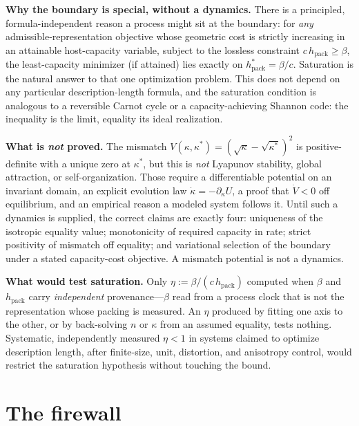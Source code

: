 \documentclass[11pt,reqno]{amsart}
\theoremstyle{plain}
\theoremstyle{definition}
\newcommand{\hpack}{h_{\mathrm{pack}}}
\begin{document}
\noindent\textbf{Why the boundary is special, without a dynamics.} There is a principled, formula-independent reason a process might sit at the boundary: for \emph{any} admissible-representation objective whose geometric cost is strictly increasing in an attainable host-capacity variable, subject to the lossless constraint $c\,\hpack\ge\beta$, the least-capacity minimizer (if attained) lies exactly on $\hpack^*=\beta/c$. Saturation is the natural answer to that one optimization problem. This does not depend on any particular description-length formula, and the saturation condition is analogous to a reversible Carnot cycle or a capacity-achieving Shannon code: the inequality is the limit, equality its ideal realization.

\medskip
\noindent\textbf{What is \emph{not} proved.} The mismatch $V(\kappa,\kappa^*)=(\sqrt\kappa-\sqrt{\kappa^*})^2$ is positive-definite with a unique zero at $\kappa^*$, but this is \emph{not} Lyapunov stability, global attraction, or self-organization. Those require a differentiable potential on an invariant domain, an explicit evolution law $\dot\kappa=-\partial_\kappa U$, a proof that $\dot V<0$ off equilibrium, and an empirical reason a modeled system follows it. Until such a dynamics is supplied, the correct claims are exactly four: uniqueness of the isotropic equality value; monotonicity of required capacity in rate; strict positivity of mismatch off equality; and variational selection of the boundary under a stated capacity-cost objective. A mismatch potential is not a dynamics.

\medskip
\noindent\textbf{What would test saturation.} Only $\eta:=\beta/(c\,\hpack)$ computed when $\beta$ and $\hpack$ carry \emph{independent} provenance---$\beta$ read from a process clock that is not the representation whose packing is measured. An $\eta$ produced by fitting one axis to the other, or by back-solving $n$ or $\kappa$ from an assumed equality, tests nothing. Systematic, independently measured $\eta<1$ in systems claimed to optimize description length, after finite-size, unit, distortion, and anisotropy control, would restrict the saturation hypothesis without touching the bound.

\section{The firewall}\label{sec:firewall}
\end{document}
